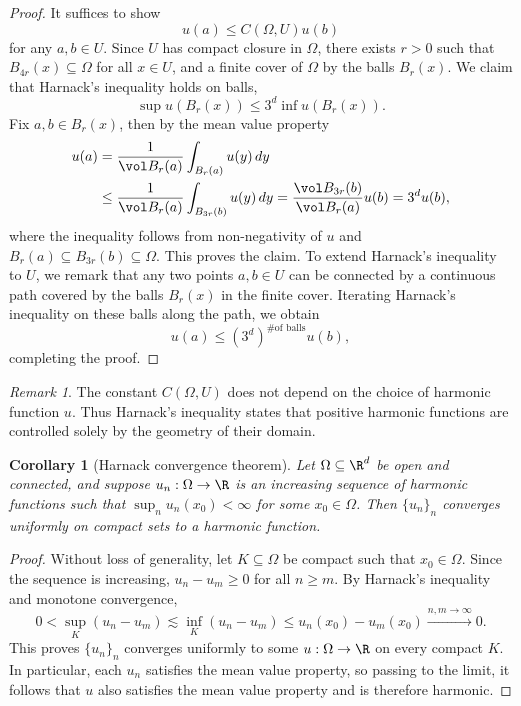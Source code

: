 \documentclass[reqno]{amsart}
\newtheorem{corollary}[theorem]{Corollary}
\theoremstyle{definition}
\theoremstyle{remark}
\newtheorem*{remark}{Remark}
\begin{document}
\begin{proof}
	It suffices to show
		\[ u(a) \leq C(\Omega, U) u(b) \]
	for any $a, b \in U$. Since $U$ has compact closure in $\Omega$, there exists $r > 0$ such that $B_{4r} (x) \subseteq \Omega$ for all $x \in U$, and a finite cover of $\Omega$ by the balls $B_r (x)$. We claim that Harnack's inequality holds on balls, 
		\[ \sup u (B_r (x)) \leq 3^d \inf u (B_r (x)). \]
	Fix $a, b \in B_r (x)$, then by the mean value property
		\begin{align*}
			u(a) 
				&= \frac{1}{\vol B_r (a)} \int_{B_r (a)} u(y) \, dy \\
				&\leq \frac{1}{\vol B_r (a)} \int_{B_{3r} (b)} u(y) \, dy =\frac{\vol B_{3r} (b) }{\vol B_r (a)} u(b) = 3^d u(b),
		\end{align*}		
	where the inequality follows from non-negativity of $u$ and $B_r (a) \subseteq B_{3r} (b) \subseteq \Omega$. This proves the claim. To extend Harnack's inequality to $U$, we remark that any two points $a, b \in U$ can be connected by a continuous path covered by the balls $B_r (x)$ in the finite cover. Iterating Harnack's inequality on these balls along the path, we obtain
		\[ u(a) \leq (3^d)^{\text{\# of balls}} u(b), \]
	completing the proof. 	
\end{proof}

\begin{remark}
	The constant $C(\Omega, U)$ does not depend on the choice of harmonic function $u$. Thus Harnack's inequality states that positive harmonic functions are controlled solely by the geometry of their domain. 
\end{remark}


\begin{corollary}[Harnack convergence theorem]
	Let $\Omega \subseteq \R^d$ be open and connected, and suppose $u_n : \Omega \to \R$ is an increasing sequence of harmonic functions such that $\sup_n u_n (x_0) < \infty$ for some $x_0 \in \Omega$. Then $\{u_n\}_n$ converges uniformly on compact sets to a harmonic function. 
\end{corollary}

\begin{proof}
	Without loss of generality, let $K \subseteq \Omega$ be compact such that $x_0 \in \Omega$. Since the sequence is increasing, $u_n - u_m \geq 0$ for all $n \geq m$. By Harnack's inequality and monotone convergence, 
		\[ 0 < \sup_K (u_n - u_m) \lesssim \inf_K (u_n - u_m) \leq u_n (x_0) - u_m (x_0) \overset{n, m \to \infty}{\longrightarrow} 0. \]
	This proves $\{u_n\}_n$ converges uniformly to some $u: \Omega \to \R$ on every compact $K$. In particular, each $u_n$ satisfies the mean value property, so passing to the limit, it follows that $u$ also satisfies the mean value property and is therefore harmonic. 
\end{proof}	
\end{document}
